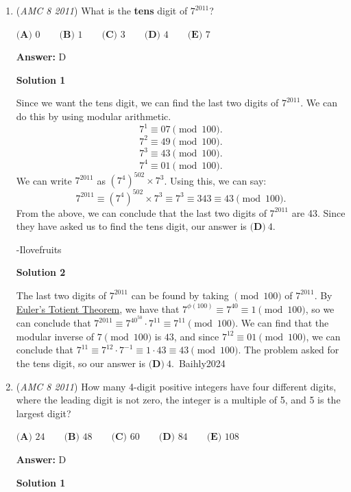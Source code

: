 \begin{enumerate}
 


	\item (\textit{AMC 8 2011}) What is the \textbf{tens} digit of $7^{2011}$?


 $\textbf{(A) }0\qquad\textbf{(B) }1\qquad\textbf{(C) }3\qquad\textbf{(D) }4\qquad\textbf{(E) }7$

 \textbf{Answer: }D



\textbf{Solution 1}

Since we want the tens digit, we can find the last two digits of $7^{2011}$.  We can do this by using modular arithmetic.
 \[7^1\equiv 07 \pmod{100}.\]
 \[7^2\equiv 49 \pmod{100}.\]
 \[7^3\equiv 43 \pmod{100}.\]
 \[7^4\equiv 01 \pmod{100}.\]We can write $7^{2011}$ as $(7^4)^{502}\times 7^3$.  Using this, we can say:
 \[7^{2011}\equiv (7^4)^{502}\times 7^3\equiv 7^3\equiv 343\equiv 43\pmod{100}.\]From the above, we can conclude that the last two digits of $7^{2011}$ are 43.  Since they have asked us to find the tens digit, our answer is $\boxed{\textbf{(D)}\ 4}$.

 -Ilovefruits

 



\textbf{Solution 2}

The last two digits of $7^{2011}$ can be found by taking $\pmod{100}$ of $7^{2011}$. By \href{https://artofproblemsolving.com/wiki/index.php?title=Euler\%27s\_Totient\_Theorem}{Euler's Totient Theorem}, we have that $7^{\phi(100)}\equiv 7^{40}\equiv 1 \pmod{100}$, so we can conclude that $7^{2011} \equiv 7^{40^{50}} \cdot 7^{11}\equiv 7^{11} \pmod{100}$. We can find that the modular inverse of $7 \pmod{100}$ is $43$, and since $7^{12}\equiv 01 \pmod{100}$, we can conclude that $7^{11}\equiv 7^{12} \cdot 7^{-1}\equiv 1 \cdot 43\equiv 43 \pmod{100}$. The problem asked for the tens digit, so our answer is $\boxed{\textbf{(D)}\ 4}$.~Baihly2024

 


	\item (\textit{AMC 8 2011}) How many 4-digit positive integers have four different digits, where the leading digit is not zero, the integer is a multiple of 5, and 5 is the largest digit?


 $\textbf{(A) }24\qquad\textbf{(B) }48\qquad\textbf{(C) }60\qquad\textbf{(D) }84\qquad\textbf{(E) }108$

 \textbf{Answer: }D



\textbf{Solution 1}


\end{enumerate}
